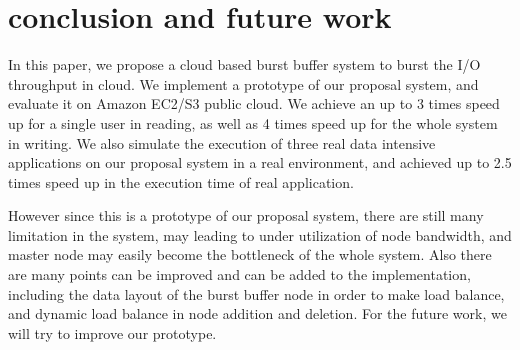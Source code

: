 \section{conclusion and future work}
\label{sec:conclusion}
In this paper, we propose a cloud based burst buffer system to burst the I/O throughput in cloud.
We implement a prototype of our proposal system, and evaluate it on Amazon EC2/S3 public cloud.
We achieve an up to 3 times speed up for a single user in reading, as well as 4 times speed
up for the whole system in writing.
We also simulate the execution of three real data intensive applications on our proposal system in
a real environment, and achieved up to 2.5 times speed up in the execution time
of real application.

However since this is a prototype of our proposal system, there are still many limitation in the
system, may leading to under utilization of node bandwidth, and master node may easily become the
bottleneck of the whole system.
Also there are many points can be improved and can be added to the implementation, including the
data layout of the burst buffer node in order to make load balance, and dynamic
load balance in node addition and deletion.
For the future work, we will try to improve our prototype.
